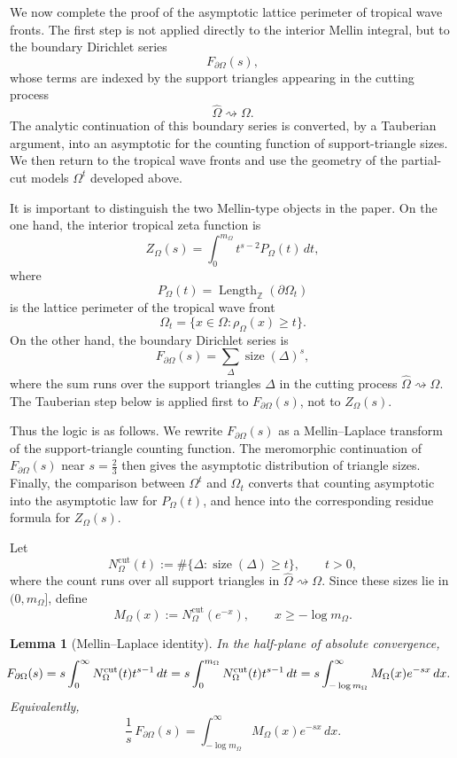 \documentclass[a4paper,american,11pt]{amsart}
\theoremstyle{plain}
\newtheorem{lemma}[theorem]{Lemma}
\theoremstyle{definition}
\newcommand{\Z}{\mathbb Z}
\DeclareMathOperator{\Length}{Length}
\begin{document}
We now complete the proof of the asymptotic lattice perimeter of tropical
wave fronts.  The first step is not applied directly to the interior Mellin
integral, but to the boundary Dirichlet series
\[
F_{\partial\Omega}(s),
\]
whose terms are indexed by the support triangles appearing in the cutting
process
\[
\widehat\Omega\rightsquigarrow\Omega.
\]
The analytic continuation of this boundary series is converted, by a
Tauberian argument, into an asymptotic for the counting function of
support-triangle sizes.  We then return to the tropical wave fronts and use
the geometry of the partial-cut models \(\Omega^t\) developed above.

It is important to distinguish the two Mellin-type objects in the paper.  On
the one hand, the interior tropical zeta function is
\[
Z_\Omega(s)=\int_0^{m_\Omega} t^{s-2}P_\Omega(t)\,dt,
\]
where
\[
P_\Omega(t)=\Length_{\Z}(\partial\Omega_t)
\]
is the lattice perimeter of the tropical wave front
\[
\Omega_t=\{x\in\Omega:\rho_\Omega(x)\ge t\}.
\]
On the other hand, the boundary Dirichlet series is
\[
F_{\partial\Omega}(s)=\sum_{\Delta}\operatorname{size}(\Delta)^s,
\]
where the sum runs over the support triangles \(\Delta\) in the cutting
process \(\widehat\Omega\rightsquigarrow\Omega\).  The Tauberian step below
is applied first to \(F_{\partial\Omega}(s)\), not to \(Z_\Omega(s)\).

Thus the logic is as follows.  We rewrite \(F_{\partial\Omega}(s)\) as a
Mellin--Laplace transform of the support-triangle counting function.  The
meromorphic continuation of \(F_{\partial\Omega}(s)\) near \(s=\frac23\) then
gives the asymptotic distribution of triangle sizes.  Finally, the comparison
between \(\Omega^t\) and \(\Omega_t\) converts that counting asymptotic into
the asymptotic law for \(P_\Omega(t)\), and hence into the corresponding
residue formula for \(Z_\Omega(s)\).

Let
\[
N^{\mathrm{cut}}_\Omega(t)
:=
\#\{\Delta:\operatorname{size}(\Delta)\ge t\},
\qquad t>0,
\]
where the count runs over all support triangles in
\(\widehat\Omega\rightsquigarrow\Omega\).  Since these sizes lie in
\((0,m_\Omega]\), define
\[
M_\Omega(x):=N^{\mathrm{cut}}_\Omega(e^{-x}),
\qquad
x\ge -\log m_\Omega.
\]

\begin{lemma}[Mellin--Laplace identity]
\label{lem:AOmega-mellin}
In the half-plane of absolute convergence,
\[\mkern-12mu
F_{\partial\Omega}(s)
=
s\int_0^\infty N^{\mathrm{cut}}_\Omega(t)t^{s-1}\,dt
=
s\int_0^{m_\Omega} N^{\mathrm{cut}}_\Omega(t)t^{s-1}\,dt
=
s\int_{-\log m_\Omega}^{\infty} M_\Omega(x)e^{-sx}\,dx.
\]
Equivalently,
\[
\frac1s\,F_{\partial\Omega}(s)
=
\int_{-\log m_\Omega}^{\infty} M_\Omega(x)e^{-sx}\,dx.
\]
\end{lemma}
\end{document}
